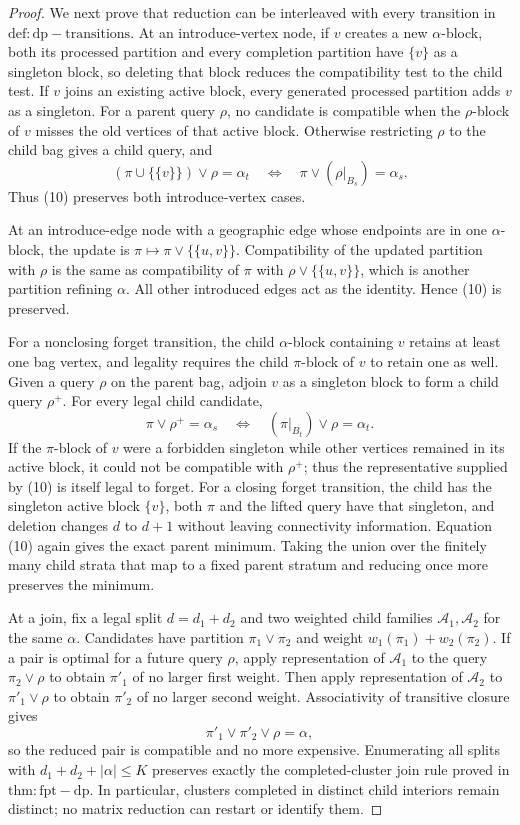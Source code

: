 \documentclass{article}
\begin{document}
\begin{proof}
We next prove that reduction can be interleaved with every transition in \(\mathrm{def:dp-transitions}\).  At an introduce-vertex node, if \(v\) creates a new \(\alpha\)-block, both its processed partition and every completion partition have \(\{v\}\) as a singleton block, so deleting that block reduces the compatibility test to the child test.  If \(v\) joins an existing active block, every generated processed partition adds \(v\) as a singleton.  For a parent query \(\rho\), no candidate is compatible when the \(\rho\)-block of \(v\) misses the old vertices of that active block.  Otherwise restricting \(\rho\) to the child bag gives a child query, and
\[
 (\pi\cup\{\{v\}\})\vee\rho=\alpha_t
 \quad\Longleftrightarrow\quad
 \pi\vee(\rho|_{B_s})=\alpha_s.
\]
Thus (10) preserves both introduce-vertex cases.

At an introduce-edge node with a geographic edge whose endpoints are in one \(\alpha\)-block, the update is \(\pi\mapsto\pi\vee\{\{u,v\}\}\).  Compatibility of the updated partition with \(\rho\) is the same as compatibility of \(\pi\) with \(\rho\vee\{\{u,v\}\}\), which is another partition refining \(\alpha\).  All other introduced edges act as the identity.  Hence (10) is preserved.

For a nonclosing forget transition, the child \(\alpha\)-block containing \(v\) retains at least one bag vertex, and legality requires the child \(\pi\)-block of \(v\) to retain one as well.  Given a query \(\rho\) on the parent bag, adjoin \(v\) as a singleton block to form a child query \(\rho^+\).  For every legal child candidate,
\[
 \pi\vee\rho^+=\alpha_s
 \quad\Longleftrightarrow\quad
 (\pi|_{B_t})\vee\rho=\alpha_t.
\tag{11}
\]
If the \(\pi\)-block of \(v\) were a forbidden singleton while other vertices remained in its active block, it could not be compatible with \(\rho^+\); thus the representative supplied by (10) is itself legal to forget.  For a closing forget transition, the child has the singleton active block \(\{v\}\), both \(\pi\) and the lifted query have that singleton, and deletion changes \(d\) to \(d+1\) without leaving connectivity information.  Equation (10) again gives the exact parent minimum.  Taking the union over the finitely many child strata that map to a fixed parent stratum and reducing once more preserves the minimum.

At a join, fix a legal split \(d=d_1+d_2\) and two weighted child families \(\mathscr A_1,\mathscr A_2\) for the same \(\alpha\).  Candidates have partition \(\pi_1\vee\pi_2\) and weight \(w_1(\pi_1)+w_2(\pi_2)\).  If a pair is optimal for a future query \(\rho\), apply representation of \(\mathscr A_1\) to the query \(\pi_2\vee\rho\) to obtain \(\pi'_1\) of no larger first weight.  Then apply representation of \(\mathscr A_2\) to \(\pi'_1\vee\rho\) to obtain \(\pi'_2\) of no larger second weight.  Associativity of transitive closure gives
\[
 \pi'_1\vee\pi'_2\vee\rho=\alpha,
\]
so the reduced pair is compatible and no more expensive.  Enumerating all splits with \(d_1+d_2+|\alpha|\le K\) preserves exactly the completed-cluster join rule proved in \(\mathrm{thm:fpt-dp}\).  In particular, clusters completed in distinct child interiors remain distinct; no matrix reduction can restart or identify them.


\end{proof}
\end{document}
